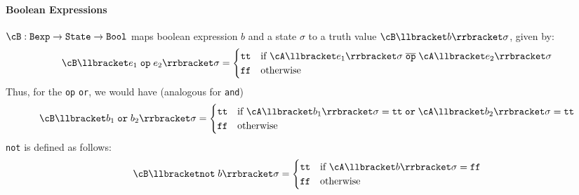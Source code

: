\paragraph{Boolean Expressions}
$\cB : \texttt{Bexp} \rightarrow \texttt{State} \rightarrow \texttt{Bool}$ maps boolean expression $b$ and a state $\sigma$ to a truth value $\cB\llbracket b \rrbracket \sigma$,
given by:
\[
    \cB\llbracket e_1 \; \texttt{op} \; e_2 \rrbracket \sigma = \begin{cases}
        \texttt{tt} & \text{if } \cA\llbracket e_1 \rrbracket \sigma \; \overline{\texttt{op}} \; \cA\llbracket e_2 \rrbracket \sigma \\
        \texttt{ff} & \text{otherwise}
    \end{cases}
\]
Thus, for the \texttt{op} \texttt{or}, we would have (analogous for \texttt{and})
\[
    \cB\llbracket b_1 \; \texttt{or} \; b_2 \rrbracket \sigma = \begin{cases}
        \texttt{tt} & \text{if } \cA\llbracket b_1 \rrbracket \sigma = \texttt{tt} \; \texttt{or} \; \cA\llbracket b_2 \rrbracket \sigma = \texttt{tt} \\
        \texttt{ff} & \text{otherwise}
    \end{cases}
\]
\texttt{not} is defined as follows:
\[
    \cB\llbracket \texttt{not}\; b \rrbracket \sigma = \begin{cases}
        \texttt{tt} & \text{if } \cA\llbracket b \rrbracket \sigma = \texttt{ff} \\
        \texttt{ff} & \text{otherwise}
    \end{cases}
\]
